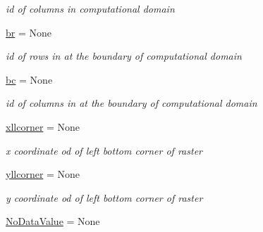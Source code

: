\begin{DoxyCompactItemize}
\begin{DoxyCompactList}\small\item\em id of columns in computational domain \end{DoxyCompactList}\item 
\hypertarget{classsmoderp2d_1_1src_1_1main__classes_1_1General_1_1Globals_a0611140edd6cbc2770b34dfe64417939}{\hyperlink{classsmoderp2d_1_1src_1_1main__classes_1_1General_1_1Globals_a0611140edd6cbc2770b34dfe64417939}{br} = None}\label{classsmoderp2d_1_1src_1_1main__classes_1_1General_1_1Globals_a0611140edd6cbc2770b34dfe64417939}

\begin{DoxyCompactList}\small\item\em id of rows in at the boundary of computational domain \end{DoxyCompactList}\item 
\hypertarget{classsmoderp2d_1_1src_1_1main__classes_1_1General_1_1Globals_ae727c98eef401d052789cfcbd636ca0b}{\hyperlink{classsmoderp2d_1_1src_1_1main__classes_1_1General_1_1Globals_ae727c98eef401d052789cfcbd636ca0b}{bc} = None}\label{classsmoderp2d_1_1src_1_1main__classes_1_1General_1_1Globals_ae727c98eef401d052789cfcbd636ca0b}

\begin{DoxyCompactList}\small\item\em id of columns in at the boundary of computational domain \end{DoxyCompactList}\item 
\hypertarget{classsmoderp2d_1_1src_1_1main__classes_1_1General_1_1Globals_ae1284ec1dde185ed719dd5a3f47b6a23}{\hyperlink{classsmoderp2d_1_1src_1_1main__classes_1_1General_1_1Globals_ae1284ec1dde185ed719dd5a3f47b6a23}{xllcorner} = None}\label{classsmoderp2d_1_1src_1_1main__classes_1_1General_1_1Globals_ae1284ec1dde185ed719dd5a3f47b6a23}

\begin{DoxyCompactList}\small\item\em x coordinate od of left bottom corner of raster \end{DoxyCompactList}\item 
\hypertarget{classsmoderp2d_1_1src_1_1main__classes_1_1General_1_1Globals_af131760c403479b939a11904eb65b3c0}{\hyperlink{classsmoderp2d_1_1src_1_1main__classes_1_1General_1_1Globals_af131760c403479b939a11904eb65b3c0}{yllcorner} = None}\label{classsmoderp2d_1_1src_1_1main__classes_1_1General_1_1Globals_af131760c403479b939a11904eb65b3c0}

\begin{DoxyCompactList}\small\item\em y coordinate od of left bottom corner of raster \end{DoxyCompactList}\item 
\hypertarget{classsmoderp2d_1_1src_1_1main__classes_1_1General_1_1Globals_ab5d999609842e6a6b5c344286e370931}{\hyperlink{classsmoderp2d_1_1src_1_1main__classes_1_1General_1_1Globals_ab5d999609842e6a6b5c344286e370931}{No\-Data\-Value} = None}\label{classsmoderp2d_1_1src_1_1main__classes_1_1General_1_1Globals_ab5d999609842e6a6b5c344286e370931}


\end{DoxyCompactItemize}
